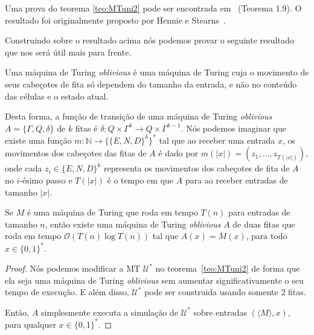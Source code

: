 Uma prova do teorema \ref{teo:MTuni2} pode ser encontrada em~\cite{arora2009computational} (Teorema 1.9). O resultado foi originalmente proposto por Hennie e Stearns~\cite{hennie1966two}.


Construindo sobre o resultado acima nós podemos provar o seguinte resultado que nos será útil mais para frente.

\begin{defi} \label{defi: oblivious}

Uma máquina de Turing \emph{oblivious} é uma máquina de Turing cuja o movimento de seus cabeçotes de fita só dependem do tamanho da entrada, e não no conteúdo das células e o estado atual.

\end{defi}

Desta forma, a função de transição de uma máquina de Turing \emph{oblivious} $A = \{\Gamma, Q, \delta\}$ de $k$ fitas é $\delta: Q \times \Gamma^{k} \to Q \times \Gamma^{k - 1}$. Nós podemos imaginar que existe uma função $m: \mathbb{N} \to \{\{E, N, D\}^{k}\}^{*}$ tal que ao receber uma entrada $x$, os movimentos dos cabeçotes das fitas de $A$ é dado por $m(\lvert x \rvert) = (z_{1}, \dots, z_{T(\lvert x \rvert)})$, onde cada $z_{i} \in \{E, N, D\}^{k}$ representa os movimentos dos cabeçotes de fita de $A$ no $i$-ésimo passo e $T(\lvert x \rvert)$ é o tempo em que $A$ para ao receber entradas de tamanho $\lvert x \rvert$.

\begin{teo}

Se $M$ é uma máquina de Turing que roda em tempo $T(n)$ para entradas de tamanho $n$, então existe uma máquina de Turing \emph{oblivious} $A$ de duas fitas que roda em tempo $\mathcal{O}(T(n)\log T(n))$ tal que $A(x) = M(x)$, para todo $x \in \{0, 1\}^{*}$.

\end{teo}

\begin{proof}

Nós podemos modificar a MT $\mathcal{U}^{*}$ no teorema~\ref{teo:MTuni2} de forma que ela seja uma máquina de Turing \emph{oblivious} sem aumentar significativamente o seu tempo de execução. E além disso, $\mathcal{U}^{*}$ pode ser construida usando somente 2 fitas.

Então, $A$ simplesmente executa a simulação de $\mathcal{U}^{*}$ sobre entradas $(\langle M \rangle, x)$, para qualquer $x \in \{0, 1\}^{*}$.

\end{proof}

